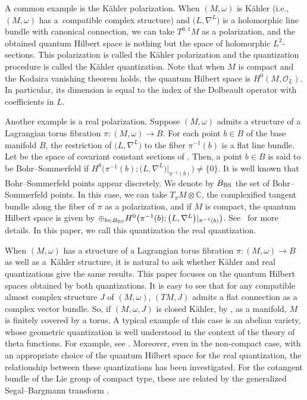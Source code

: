 \documentclass[10pt,a4paper]{amsart}
\numberwithin{equation}{section}
\newcommand{\C}{\mathbb{C}}
\newcommand{\CO}{\mathcal O}
\begin{document}
A common example is the K\"ahler polarization. When $(M,\omega)$ is K\"ahler (i.e., $(M,\omega)$ has a~compatible complex structure) and $\bigl(L,\nabla^L\bigr)$ is a holomorphic line bundle with canonical connection, we can take $T^{0,1}M$ as a polarization, and the obtained quantum Hilbert space is nothing but the space of holomorphic $L^2$-sections. This polarization is called the K\"ahler polarization and the quantization procedure is called the K\"ahler quantization. Note that when $M$ is compact and the Kodaira vanishing theorem holds, the quantum Hilbert space is $H^0(M,\CO_L)$. In particular, its dimension is equal to the index of the Dolbeault operator with coefficients in $L$.

Another example is a real polarization. Suppose $(M,\omega)$ admits a structure of a Lagrangian torus fibration $\pi\colon (M,\omega)\to B$. For each point $b\in B$ of the base manifold $B$, the restriction  of $\bigl(L,\nabla^L\bigr)$ to the fiber $\pi^{-1}(b)$ is a flat line bundle. Let  be the space of covariant constant sections of . Then, a point $b\in B$ is said to be Bohr--Sommerfeld if $H^0\bigl(\pi^{-1}(b); \bigl(L,\nabla^L\bigr)|_{\pi^{-1}(b)}\bigr)\not=\{ 0\}$. It is well known that Bohr--Sommerfeld points appear discretely. We denote by $B_{\rm BS}$ the set of Bohr--Sommerfeld points. In this case, we can take $T_\pi M\otimes \C $, the complexified tangent bundle along the fiber of $\pi$ as a polarization, and if $M$ is compact, the quantum Hilbert space is given by $\oplus_{b\in B_{\rm BS}}H^0\bigl(\pi^{-1}(b); \bigl(L,\nabla^L\bigr)|_{\pi^{-1}(b)}\bigr)$. See~\cite{Sn} for more details. In this paper, we call this quantization the real quantization.

When $(M,\omega)$ has a structure of a Lagrangian torus fibration $\pi\colon (M,\omega)\to B$ as well as a~K\"ahler structure,
it is natural to ask whether K\"ahler and real quantizations give the same results. This paper focuses on the quantum Hilbert spaces obtained by both quantizations.
It is easy to see that for any compatible almost complex structure $J$ of $(M,\omega)$, $(TM,J)$ admits a flat connection as a complex vector bundle. So, if $(M,\omega ,J)$ is closed K\"ahler, by \cite[Exemples~12.5.2\,(ii)]{MR0278248}, as a manifold, $M$ is finitely covered by a torus. A typical example of this case is an abelian variety, whose geometric quantization is well understood in the context of the theory of theta functions. For example, see \cite{BMN}. Moreover, even in the non-compact case, with an appropriate choice of the quantum Hilbert space for the real quantization, the relationship between these quantizations has been investigated. For the cotangent bundle of the Lie group of compact type, these are related by the generalized Segal--Bargmann transform \cite{MR1892462}.
\end{document}

